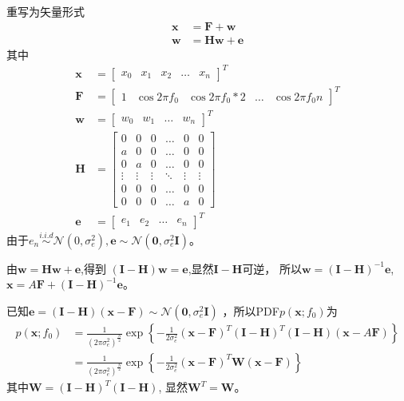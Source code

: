 \documentclass[fontset=windows]{article}
\numberwithin{figure}{section}
\begin{document}
重写为矢量形式
\begin{align*}
	\mathbf{x} & =\mathbf{F}+\mathbf{w}           \\
	\mathbf{w} & =\mathbf{H}\mathbf{w}+\mathbf{e}
\end{align*}
其中
\begin{align*}
	\mathbf{x} & =
	\begin{bmatrix}
		x_0 & x_1 & x_2 & \dots & x_n
	\end{bmatrix}^T  \\
	\mathbf{F} & =
	\begin{bmatrix}
		1 & \cos2\pi f_0 & \cos2\pi f_0*2 & \dots & \cos2\pi f_0 n
	\end{bmatrix}^T  \\
	\mathbf{w} & =
	\begin{bmatrix}
		w_0 & w_1 & \dots & w_n
	\end{bmatrix}^T \\
	\mathbf{H} & =
	\begin{bmatrix}
		0      & 0      & 0      & \dots  & 0      & 0      \\
		a      & 0      & 0      & \dots  & 0      & 0      \\
		0      & a      & 0      & \dots  & 0      & 0      \\
		\vdots & \vdots & \vdots & \ddots & \vdots & \vdots \\
		0      & 0      & 0      & \dots  & 0      & 0      \\
		0      & 0      & 0      & \dots  & a      & 0
	\end{bmatrix}   \\
	\mathbf{e} & =
	\begin{bmatrix}
		e_1 & e_2 & \dots & e_n
	\end{bmatrix}^T
\end{align*}
由于\(e_n\overset{i.i.d}{\sim} \mathcal{N} (0,\sigma_e^2),
\mathbf{e}\sim \mathcal{N}(\mathbf{0},\sigma_e^2\mathbf{I})\)。

由\(\mathbf{w}=\mathbf{H}\mathbf{w}+\mathbf{e}\),得到
\((\mathbf{I}-\mathbf{H})\mathbf{w}=\mathbf{e}\),显然\(\mathbf{I}-\mathbf{H}\)可逆，
所以\(\mathbf{w}=(\mathbf{I}-\mathbf{H})^{-1}\mathbf{e}\),
\(\mathbf{x}=A\mathbf{F}+(\mathbf{I}-\mathbf{H})^{-1}\mathbf{e}\)。

已知\(\mathbf{e}=(\mathbf{I}-\mathbf{H})(\mathbf{x}-\mathbf{F})
\sim \mathcal{N}(\mathbf{0},\sigma_e^2\mathbf{I})\)
，所以PDF\(p(\mathbf{x};f_0)\)为
\begin{align*}
	p(\mathbf{x};f_0) & =\frac{1}{(2\pi \sigma_e^2)^{\frac{N}{2}}}
	\exp\left\{ -\frac{1}{2\sigma_e^2}(\mathbf{x}-\mathbf{F})^T(\mathbf{I}-\mathbf{H})^T
	(\mathbf{I}-\mathbf{H})(\mathbf{x}-A\mathbf{F})\right\}        \\
	                  & =\frac{1}{(2\pi \sigma_e^2)^{\frac{N}{2}}}
	\exp\left\{ -\frac{1}{2\sigma_e^2}(\mathbf{x}-\mathbf{F})^T\mathbf{W}
	(\mathbf{x}-\mathbf{F})\right\}
\end{align*}
其中\(\mathbf{W}=(\mathbf{I}-\mathbf{H})^T(\mathbf{I}-\mathbf{H})\),
显然\(\mathbf{W}^T=\mathbf{W}\)。
\end{document}

